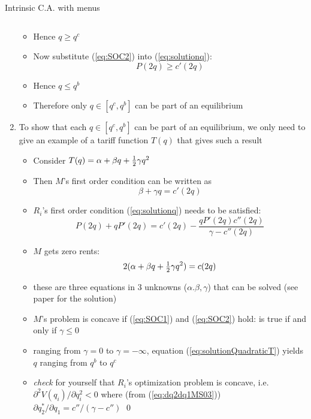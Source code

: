 \documentclass[11pt,english]{beamer}
\newcommand{\hf}{{\textstyle{1\over 2}}}
\newcommand{\dif}{\partial}
\begin{document}
\begin{frame}[allowframebreaks]{Intrinsic C.A. with menus}
\begin{enumerate}
\begin{itemize}
\begin{equation*}
        \end{equation*}
      \item Hence $q \geq q^c$
      \item Now substitute (\ref{eq:SOC2}) into (\ref{eq:solutionq}):
        \begin{equation*}
          P(2q) \geq c'(2q)
        \end{equation*}
      \item Hence $q \leq q^b$
      \item Therefore only $q \in [q^c,q^b]$ can be part of an equilibrium
      \end{itemize}
    \item To show that each $q \in [q^c,q^b]$ can be part of an
      equilibrium, we only need to give an example of a tariff
      function $T(q)$ that gives such a result
      \begin{itemize}
      \item Consider $T(q) = \alpha + \beta q+\hf \gamma q^2$
      \item Then $M$'s first order condition can be written as
        \begin{equation*}
          \beta +\gamma q = c'(2q)
        \end{equation*}
      \item $R_i$'s first order condition (\ref{eq:solutionq}) needs
        to be satisfied:
        \begin{equation} \label{eq:solutionQuadraticT}
          P(2q) + qP'(2q) = c'(2q) - \frac{q P'(2q)c''(2q)}{\gamma-c''(2q)}
        \end{equation}
      \item $M$ gets zero rents:
        \begin{equation*}
          2(\alpha + \beta q+\hf \gamma q^2) = c(2q)
        \end{equation*}
      \item these are three equations in 3 unknowns
        ($\alpha.\beta,\gamma$) that can be solved (see paper for the solution)
      \item $M$'s problem is concave if (\ref{eq:SOC1}) and
        (\ref{eq:SOC2}) hold: is true if and only if $\gamma \leq 0$
      \item ranging from $\gamma=0$ to $\gamma=-\infty$, equation
        (\ref{eq:solutionQuadraticT}) yields $q$ ranging from $q^b$ to $q^c$
      \item \emph{check} for yourself that $R_i$'s optimization problem is
        concave, i.e. $\dif^2 V(q_i)/\dif q_i^2 < 0$ where (from (\ref{eq:dq2dq1MS03})) $\dif
        q_2^*/\dif q_1 = c''/(\gamma-c'')$ \qed
      \end{itemize}
    \end{enumerate}
\end{frame}
\end{document}
